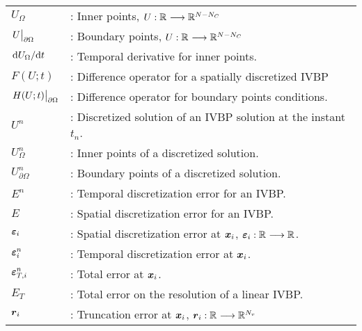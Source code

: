 \begin{tabular}{ll}
      $U_{\Omega}$ & :  Inner points, $U : \mathbb{R}^{} \longrightarrow \mathbb{R}^{N-N_C}$\\
     
      $\eval{U}_{\partial\Omega}$ & :  Boundary points, $U : \mathbb{R}^{} \longrightarrow \mathbb{R}^{N-N_C}$\\
     
      $\dv*{U_{\Omega}}{t}$ & :  Temporal derivative  for inner points.\\
     
      $F(U;t)$ & :  Difference operator for a spatially discretized IVBP  \\ %
     
      $ \eval{H(U;t)}_{\partial\Omega} $ & :  Difference operator for boundary points conditions. \\
     
      $U^n$ & :  Discretized solution of an IVBP solution at the instant $t_n$.\\
     
      $U_{\Omega}^n$ & : Inner points of a discretized solution.\\
     
      $U_{\partial\Omega}^n$ & :  Boundary points of a discretized solution. \\
     
     
    
      $E^n$ & :  Temporal discretization error for an IVBP.\\
     
      $E$ & :  Spatial discretization  error for an IVBP.\\
     
      $\boldsymbol{\varepsilon}_{i}$ & :  Spatial discretization error at $\boldsymbol{x}_i$, $\boldsymbol{\varepsilon}_i : \mathbb{R}^{} \longrightarrow \mathbb{R}^{}$.\\
     
      $\boldsymbol{\varepsilon}_{i}^n$ & :  Temporal discretization error at $\boldsymbol{x}_i$.\\
     
      $\boldsymbol{\varepsilon}_{T,i}^n$ & :  Total error at $\boldsymbol{x}_i$.\\
     
      $E_T$ & :  Total error on the resolution of a linear IVBP.\\
     
      $\boldsymbol{r}_i$ & :  Truncation error at $\boldsymbol{x}_i$, $\boldsymbol{r}_i : \mathbb{R}^{} \longrightarrow \mathbb{R}^{N_v}$\\
     

\end{tabular}
